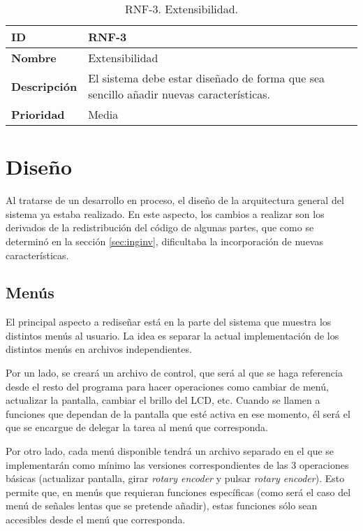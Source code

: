 \begin{table}[h!]
    \centering
    \begin{tabular}{|m{2.5cm}|m{9.27cm}|}
        \hline
        \textbf{ID} & RNF-3 \\
        \hline
        \textbf{Nombre} & Extensibilidad \\
        \hline
        \textbf{Descripción} & El sistema debe estar diseñado de forma que sea sencillo añadir nuevas características. \\
        \hline
        \textbf{Prioridad} & Media \\
        \hline
    \end{tabular}
    \caption{RNF-3. Extensibilidad.}
\end{table}

\section{Diseño}
\label{sec:fw_diseño}

Al tratarse de un desarrollo en proceso, el diseño de la arquitectura general del sistema ya estaba realizado. En este aspecto, los cambios a realizar son los derivados de la redistribución del código de algunas partes, que como se determinó en la sección \ref{sec:inginv}, dificultaba la incorporación de nuevas características.

\subsection{Menús}

El principal aspecto a rediseñar está en la parte del sistema que muestra los distintos menús al usuario. La idea es separar la actual implementación de los distintos menús en archivos independientes.

Por un lado, se creará un archivo de control, que será al que se haga referencia desde el resto del programa para hacer operaciones como cambiar de menú, actualizar la pantalla, cambiar el brillo del LCD, etc. Cuando se llamen a funciones que dependan de la pantalla que esté activa en ese momento, él será el que se encargue de delegar la tarea al menú que corresponda.

Por otro lado, cada menú disponible tendrá un archivo separado en el que se implementarán como mínimo las versiones correspondientes de las 3 operaciones básicas (actualizar pantalla, girar \textit{rotary encoder} y pulsar \textit{rotary encoder}). Esto permite que, en menús que requieran funciones específicas (como será el caso del menú de señales lentas que se pretende añadir), estas funciones sólo sean accesibles desde el menú que corresponda.

